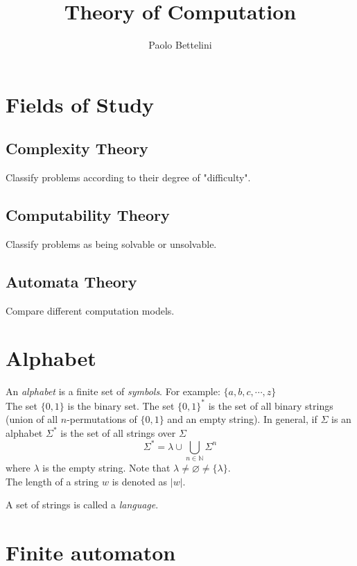 \documentclass{article}
\title{Theory of Computation}
\author{Paolo Bettelini}
\date{}
\newcommand{\emptyString}{\lambda}
\begin{document}
\maketitle
\tableofcontents
\pagebreak

\section{Fields of Study}

\subsection{Complexity Theory}

Classify problems according to their degree
of "difficulty".

\subsection{Computability Theory}

Classify problems as being solvable or unsolvable.

\subsection{Automata Theory}

Compare different computation models.

\section{Alphabet}

An \textit{alphabet} is a finite set of \textit{symbols}.
For example: \(\{a,b,c,\cdots, z\}\)\\
The set \(\{0,1\}\) is the binary set. The set \(\{0,1\}^*\) is the set of
all binary strings (union of all \(n\)-permutations of \(\{0,1\}\) and an empty string).
In general, if \(\Sigma\) is an alphabet \(\Sigma^*\) is the set
of all strings over \(\Sigma\)
\[
    \Sigma^* = \emptyString \cup \bigcup_{n\in\mathbb{N}} \Sigma^n
\]
where \(\emptyString\) is the empty string.
Note that \(\emptyString \neq \varnothing \neq \{\emptyString\}\).
\\
The length of a string \(w\) is denoted as \(|w|\).

A set of strings is called a \textit{language}.

\section{Finite automaton}
\end{document}
